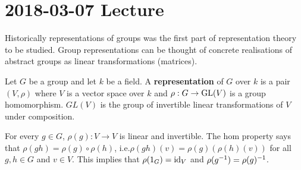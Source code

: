 \section{2018-03-07 Lecture}

Historically representations of groups was the first part of representation theory to be studied.
Group representations can be thought of concrete realisations of abstract groups as linear transformations (matrices).

\begin{defn}
	Let $G$ be a group and let $k$ be a field.
	A \textbf{representation} of $G$ over $k$ is a pair $(V,\rho)$ where $V$ is a vector space over $k$ and $\rho: G \to \operatorname{GL}(V)$ is a group homomorphism.
	$GL(V)$ is the group of invertible linear transformations of $V$ under composition.
\end{defn}

\begin{rmk}
	For every $g \in G$, $\rho(g):V \to V$ is linear and invertible.
	The hom property says that $\rho(gh)=\rho(g)\circ\rho(h)$, i.e.\@ $\rho(gh)(v) = \rho(g)\left(\rho(h)(v)\right)$ for all $g,h \in G$ and $v \in V$.
	This implies that $\rho(1_G)=\operatorname{id}_V$ and $\rho(g^{-1})=\rho(g)^{-1}$.	
\end{rmk}

